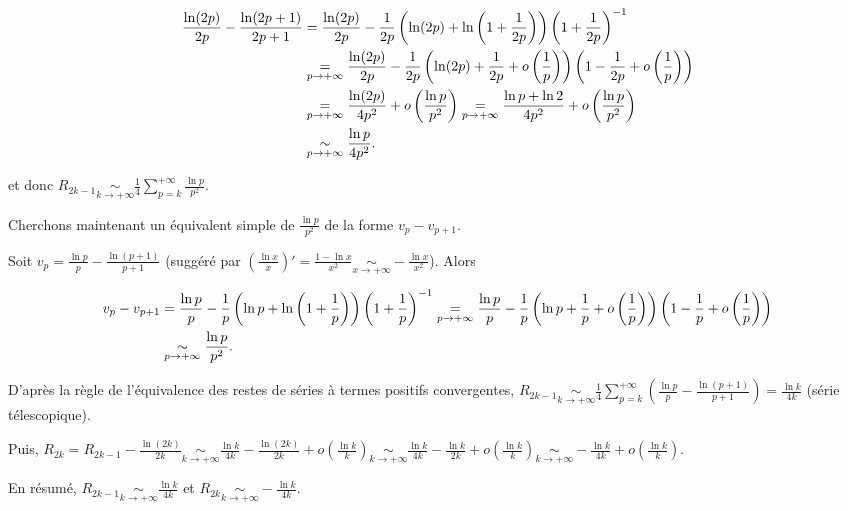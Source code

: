 {{\begin{align*}\ensuremath
\frac{\ln(2p)}{2p}-\frac{\ln(2p+1)}{2p+1}&=\frac{\ln(2p)}{2p}-\frac{1}{2p}\left(\ln(2p)+\ln\left(1+\frac{1}{2p}\right)\right)\left(1+\frac{1}{2p}\right)^{-1}\\
 &\underset{p\rightarrow+\infty}{=}\frac{\ln(2p)}{2p}-\frac{1}{2p}\left(\ln(2p)+\frac{1}{2p}+o\left(\frac{1}{p}\right)\right)\left(1-\frac{1}{2p}+o\left(\frac{1}{p}\right)\right)\\
 &\underset{p\rightarrow+\infty}{=}\frac{\ln(2p)}{4p^2}+o\left(\frac{\ln p}{p^2}\right)\underset{p\rightarrow+\infty}{=}\frac{\ln p+\ln2}{4p^2}+o\left(\frac{\ln p}{p^2}\right)\\
 &\underset{p\rightarrow+\infty}{\sim}\frac{\ln p}{4p^2}.
\end{align*}   

et donc $R_{2k-1}\underset{k\rightarrow+\infty}{\sim}\frac{1}{4}\sum_{p=k}^{+\infty}\frac{\ln p}{p^2}$.

Cherchons maintenant un équivalent simple de $\frac{\ln p}{p^2}$  de la forme $v_p - v_{p+1}$. 

Soit $v_p=\frac{\ln p}{p}-\frac{\ln(p+1)}{p+1}$ (suggéré par $\left(\frac{\ln x}{x}\right)'=\frac{1-\ln x}{x^2}\underset{x\rightarrow+\infty}{\sim}-\frac{\ln x}{x^2}$). Alors 

\begin{align*}\ensuremath
v_p- v_{p+1}&=\frac{\ln p}{p}-\frac{1}{p}\left(\ln p+\ln\left(1+\frac{1}{p}\right)\right)\left(1+\frac{1}{p}\right)^{-1}\underset{p\rightarrow+\infty}{=}\frac{\ln p}{p}-\frac{1}{p}\left(\ln p+\frac{1}{p}+o\left(\frac{1}{p}\right)\right)\left(1-\frac{1}{p}+o\left(\frac{1}{p}\right)\right)\\
 &\underset{p\rightarrow+\infty}{\sim}\frac{\ln p}{p^2}.
\end{align*}

D'après la règle de l'équivalence des restes de séries à termes positifs convergentes, $R_{2k-1}\underset{k\rightarrow+\infty}{\sim}\frac{1}{4}\sum_{p=k}^{+\infty}\left(\frac{\ln p}{p}-\frac{\ln(p+1)}{p+1}\right)=\frac{\ln k}{4k}$ (série télescopique). 

Puis, $R_{2k}=R_{2k-1}-\frac{\ln(2k)}{2k}\underset{k\rightarrow+\infty}{\sim}\frac{\ln k}{4k}-\frac{\ln(2k)}{2k}+o\left(\frac{\ln k}{k}\right)\underset{k\rightarrow+\infty}{\sim}\frac{\ln k}{4k}-\frac{\ln k}{2k}+o\left(\frac{\ln k}{k}\right)\underset{k\rightarrow+\infty}{\sim}-\frac{\ln k}{4k}+o\left(\frac{\ln k}{k}\right)$.

En résumé, $R_{2k-1}\underset{k\rightarrow+\infty}{\sim}\frac{\ln k}{4k}$ et $R_{2k}\underset{k\rightarrow+\infty}{\sim}-\frac{\ln k}{4k}$.

}}
